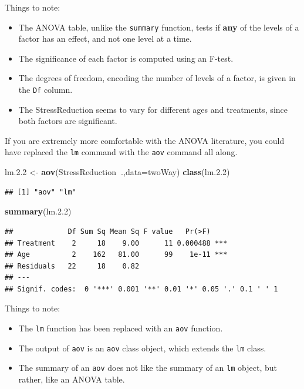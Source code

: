\documentclass[]{book}
\newenvironment{Shaded}{\begin{snugshade}}{\end{snugshade}}
\newcommand{\KeywordTok}[1]{\textcolor[rgb]{0.13,0.29,0.53}{\textbf{#1}}}
\newcommand{\DataTypeTok}[1]{\textcolor[rgb]{0.13,0.29,0.53}{#1}}
\newcommand{\FloatTok}[1]{\textcolor[rgb]{0.00,0.00,0.81}{#1}}
\newcommand{\StringTok}[1]{\textcolor[rgb]{0.31,0.60,0.02}{#1}}
\newcommand{\OperatorTok}[1]{\textcolor[rgb]{0.81,0.36,0.00}{\textbf{#1}}}
\newcommand{\NormalTok}[1]{#1}
\providecommand{\tightlist}{%
  \setlength{\itemsep}{0pt}\setlength{\parskip}{0pt}}
\theoremstyle{definition}
\theoremstyle{definition}
\theoremstyle{definition}
\theoremstyle{remark}
\begin{document}
Things to note:

\begin{itemize}
\tightlist
\item
  The ANOVA table, unlike the \texttt{summary} function, tests if
  \textbf{any} of the levels of a factor has an effect, and not one
  level at a time.
\item
  The significance of each factor is computed using an F-test.
\item
  The degrees of freedom, encoding the number of levels of a factor, is
  given in the \texttt{Df} column.
\item
  The StressReduction seems to vary for different ages and treatments,
  since both factors are significant.
\end{itemize}

If you are extremely more comfortable with the ANOVA literature, you
could have replaced the \texttt{lm} command with the \texttt{aov}
command all along.

\begin{Shaded}
\begin{Highlighting}[]
\NormalTok{lm.}\FloatTok{2.2}\NormalTok{ <-}\StringTok{ }\KeywordTok{aov}\NormalTok{(StressReduction}\OperatorTok{~}\NormalTok{.,}\DataTypeTok{data=}\NormalTok{twoWay)}
\KeywordTok{class}\NormalTok{(lm.}\FloatTok{2.2}\NormalTok{)}
\end{Highlighting}
\end{Shaded}

\begin{verbatim}
## [1] "aov" "lm"
\end{verbatim}

\begin{Shaded}
\begin{Highlighting}[]
\KeywordTok{summary}\NormalTok{(lm.}\FloatTok{2.2}\NormalTok{)}
\end{Highlighting}
\end{Shaded}

\begin{verbatim}
##             Df Sum Sq Mean Sq F value   Pr(>F)    
## Treatment    2     18    9.00      11 0.000488 ***
## Age          2    162   81.00      99    1e-11 ***
## Residuals   22     18    0.82                     
## ---
## Signif. codes:  0 '***' 0.001 '**' 0.01 '*' 0.05 '.' 0.1 ' ' 1
\end{verbatim}

Things to note:

\begin{itemize}
\tightlist
\item
  The \texttt{lm} function has been replaced with an \texttt{aov}
  function.
\item
  The output of \texttt{aov} is an \texttt{aov} class object, which
  extends the \texttt{lm} class.
\item
  The summary of an \texttt{aov} does not like the summary of an
  \texttt{lm} object, but rather, like an ANOVA table.
\end{itemize}
\end{document}
